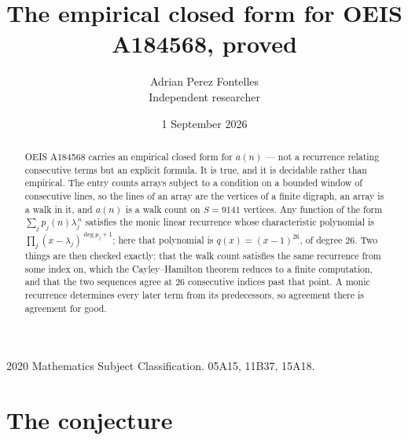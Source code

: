 \documentclass[11pt,a4paper]{article}
\title{The empirical closed form for OEIS A184568, proved}
\author{Adrian Perez Fontelles\\ \small Independent researcher}
\date{1 September 2026}
\theoremstyle{plain}
\theoremstyle{definition}
\begin{document}
\maketitle

\begin{abstract}
OEIS A184568 carries an empirical closed form for $a(n)$ --- not a recurrence relating
consecutive terms but an explicit formula. It is true, and it is decidable rather than
empirical. The entry counts arrays subject to a condition on a bounded window of consecutive lines, so the lines of an array are the
vertices of a finite digraph, an array is a walk in it, and $a(n)$ is a walk count on
$S=9141$ vertices. Any function of the form $\sum_j p_j(n)\lambda_j^{\,n}$ satisfies the
monic linear recurrence whose characteristic polynomial is
$\prod_j(x-\lambda_j)^{\deg p_j+1}$; here that polynomial is $q(x)=(x-1)^{26}$, of degree
$26$. Two things are then checked exactly: that the walk count satisfies the same
recurrence from some index on, which the Cayley--Hamilton theorem reduces to a finite
computation, and that the two sequences agree at $26$ consecutive indices past that
point. A monic recurrence determines every later term from its predecessors, so agreement
there is agreement for good.
\end{abstract}

\noindent\small 2020 Mathematics Subject Classification. 05A15, 11B37, 15A18.\normalsize

\section{The conjecture}
\end{document}
